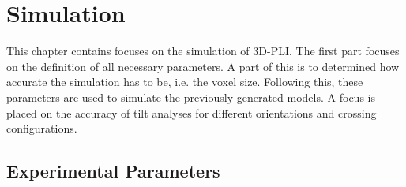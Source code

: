 \setcounter{chapter}{7}
\chapter{Simulation}
\label{cha:simulation_analysis}
% 
% 
% 
This chapter contains focuses on the simulation of \ac{3D-PLI}.
The first part focuses on the definition of all necessary parameters.
A part of this is to determined how accurate the simulation has to be, i.e. the voxel size.
Following this, these parameters are used to simulate the previously generated models.
A focus is placed on the accuracy of tilt analyses for different orientations and crossing configurations.
% 
% 
% 
% 
% 
% 
\section{Experimental Parameters}
% 
